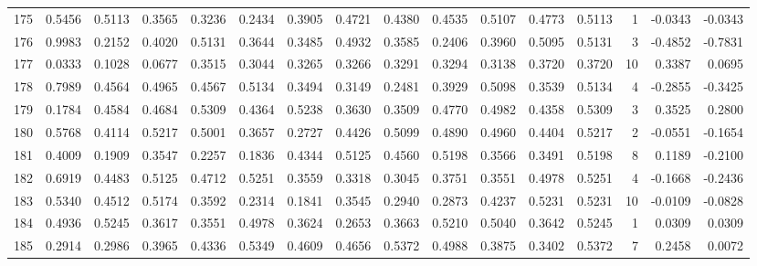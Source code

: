 \begin{tabular}{lrrrrrrrrrrrrrrr}
175 &      0.5456 &  0.5113 &  0.3565 &  0.3236 &  0.2434 &  0.3905 &  0.4721 &  0.4380 &  0.4535 &  0.5107 &   0.4773 &     0.5113 &      1 &                   -0.0343 &                    -0.0343 \\
176 &      0.9983 &  0.2152 &  0.4020 &  0.5131 &  0.3644 &  0.3485 &  0.4932 &  0.3585 &  0.2406 &  0.3960 &   0.5095 &     0.5131 &      3 &                   -0.4852 &                    -0.7831 \\
177 &      0.0333 &  0.1028 &  0.0677 &  0.3515 &  0.3044 &  0.3265 &  0.3266 &  0.3291 &  0.3294 &  0.3138 &   0.3720 &     0.3720 &     10 &                    0.3387 &                     0.0695 \\
178 &      0.7989 &  0.4564 &  0.4965 &  0.4567 &  0.5134 &  0.3494 &  0.3149 &  0.2481 &  0.3929 &  0.5098 &   0.3539 &     0.5134 &      4 &                   -0.2855 &                    -0.3425 \\
179 &      0.1784 &  0.4584 &  0.4684 &  0.5309 &  0.4364 &  0.5238 &  0.3630 &  0.3509 &  0.4770 &  0.4982 &   0.4358 &     0.5309 &      3 &                    0.3525 &                     0.2800 \\
180 &      0.5768 &  0.4114 &  0.5217 &  0.5001 &  0.3657 &  0.2727 &  0.4426 &  0.5099 &  0.4890 &  0.4960 &   0.4404 &     0.5217 &      2 &                   -0.0551 &                    -0.1654 \\
181 &      0.4009 &  0.1909 &  0.3547 &  0.2257 &  0.1836 &  0.4344 &  0.5125 &  0.4560 &  0.5198 &  0.3566 &   0.3491 &     0.5198 &      8 &                    0.1189 &                    -0.2100 \\
182 &      0.6919 &  0.4483 &  0.5125 &  0.4712 &  0.5251 &  0.3559 &  0.3318 &  0.3045 &  0.3751 &  0.3551 &   0.4978 &     0.5251 &      4 &                   -0.1668 &                    -0.2436 \\
183 &      0.5340 &  0.4512 &  0.5174 &  0.3592 &  0.2314 &  0.1841 &  0.3545 &  0.2940 &  0.2873 &  0.4237 &   0.5231 &     0.5231 &     10 &                   -0.0109 &                    -0.0828 \\
184 &      0.4936 &  0.5245 &  0.3617 &  0.3551 &  0.4978 &  0.3624 &  0.2653 &  0.3663 &  0.5210 &  0.5040 &   0.3642 &     0.5245 &      1 &                    0.0309 &                     0.0309 \\
185 &      0.2914 &  0.2986 &  0.3965 &  0.4336 &  0.5349 &  0.4609 &  0.4656 &  0.5372 &  0.4988 &  0.3875 &   0.3402 &     0.5372 &      7 &                    0.2458 &                     0.0072 \\

\end{tabular}
